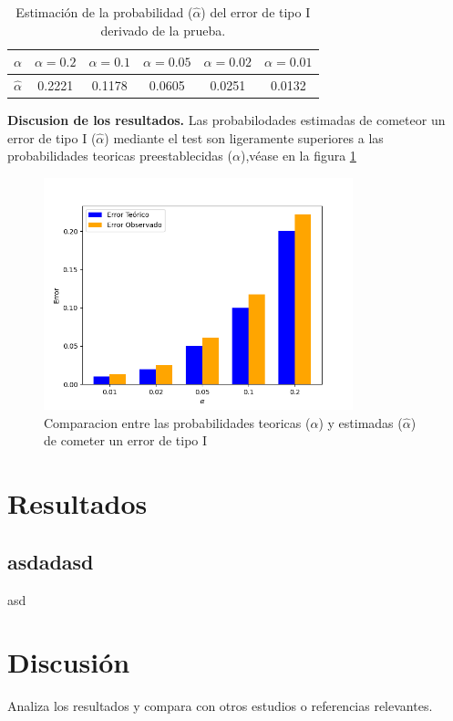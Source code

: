 \documentclass[12pt]{report}
\begin{document}
\begin{table}[h!]
	\centering
	\begin{tabular}{|c|ccccc|}
		\hline
		$\alpha$ & $\alpha = 0.2$ & $\alpha = 0.1$ & $\alpha = 0.05$ & $\alpha = 0.02$ & $\alpha = 0.01$ \\
		\hline
		$\hat{\alpha}$ & 0.2221 & 0.1178 & 0.0605 & 0.0251 & 0.0132 \\
		\hline
	\end{tabular}
	\caption{Estimación de la probabilidad ($\hat{\alpha}$) del error de tipo I derivado de la prueba.}
	\label{tab:error1-prob}
\end{table}

\textbf{Discusion de los resultados.}
Las probabilodades estimadas de cometeor un error de tipo I ($\hat{\alpha}$) mediante el test son ligeramente superiores  a las probabilidades teoricas preestablecidas ($\alpha$),véase en la figura \ref{Teorico vs Observado}
	\begin{figure}[ht]
	\centering
	
	\includegraphics[width=0.8\textwidth]{3td_teo_obs.png}
	\caption{Comparacion entre las probabilidades teoricas ($\alpha$) y estimadas ($\hat{\alpha}$) de cometer un error de tipo I }
	\label{Teorico vs Observado}
\end{figure}
\chapter{Resultados}
\section{asdadasd}
asd

\chapter{Discusión}
Analiza los resultados y compara con otros estudios o referencias relevantes.
\end{document}
